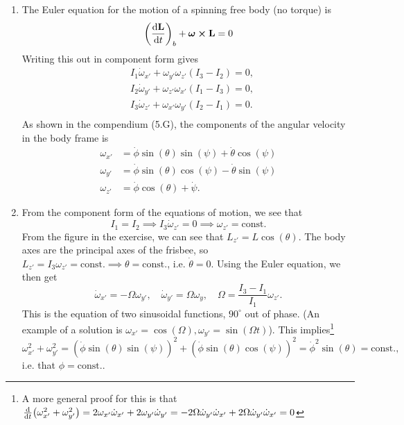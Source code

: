 \documentclass{article}
\begin{document}
    \begin{enumerate}[label=(\alph*)]
    \item The Euler equation for the motion of a spinning free body (no torque) is 
        \begin{equation*}
            \left(\dv{\mathbf{L}}{t}\right)_b + \boldsymbol \omega \cross \mathbf{L} = 0
        \end{equation*}
        Writing this out in component form gives
        \begin{align*}
            & I_1 \dot \omega_{x'} + \omega_{y'}\omega_{z'}(I_3 - I_2) = 0, \\
            & I_2 \dot \omega_{y'} + \omega_{z'}\omega_{x'}(I_1 - I_3) = 0, \\
            & I_3 \dot \omega_{z'} + \omega_{x'}\omega_{y'}(I_2 - I_1) = 0 .\\
        \end{align*}
        As shown in the compendium (5.G), the components of the angular velocity in the body frame is 
        \begin{align*}
            \omega_{x'} & = \dot \phi \sin(\theta) \sin(\psi) + \dot\theta \cos(\psi) \\
            \omega_{y'} & = \dot \phi \sin(\theta)\cos(\psi) - \dot \theta  \sin(\psi)\\
            \omega_{z'} & = \dot \phi \cos(\theta) + \dot \psi.
        \end{align*}

    \item From the component form of the equations of motion, we see that 
        \begin{equation*}
            I_1 = I_2 \implies I_3 \dot \omega_{z'} = 0 \implies \omega_{z'} = \mathrm{const.}
        \end{equation*}
        From the figure in the exercise, we can see that $L_{z'} = L \cos(\theta)$. The body axes are the principal axes of the frisbee, so $L_{z'} = I_3 \omega_{z'} = \mathrm{const.} \implies \theta = \mathrm{const.}$, i.e. $\dot \theta = 0$. Using the Euler equation, we then get
        \begin{equation*}
            \dot \omega_{x'} = -\Omega \omega_{y'}, \quad \dot \omega_{y'} = \Omega \omega_{y}, \quad \Omega = \frac{I_3 - I_1}{I_1} \omega_{z'}.
        \end{equation*}
        This is the equation of two sinusoidal functions, $90^\circ$ out of phase. (An example of a solution is $\omega_{x'} = \cos(\Omega), \omega_{y'} = \sin(\Omega t)$). This implies\footnote{A more general proof for this is that $\dv t (\omega_{x'}^2 + \omega_{y'}^2) = 2\omega_{x'} \dot \omega_{x'} + 2 \omega_{y'} \dot \omega_{y'} = -2\Omega \dot \omega_{y'} \dot \omega_{x'} + 2\Omega \dot \omega_{y'} \dot \omega_{x'} = 0$ }
        \begin{equation*}
            \omega_{x'}^2 + \omega_{y'}^2 = \left( \dot \phi \sin(\theta) \sin(\psi) \right)^2 + \left( \dot \phi \sin(\theta)\cos(\psi) \right)^2 = \dot \phi^2 \sin(\theta) = \mathrm{const.},
        \end{equation*}
        i.e. that $\phi = \mathrm{const.}$.

    \end{enumerate}
\end{document}
